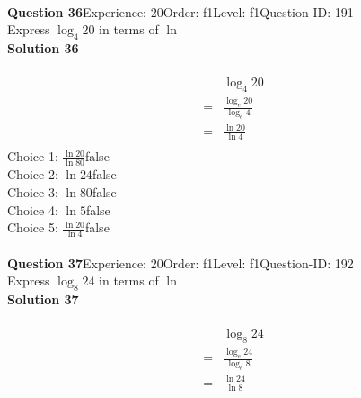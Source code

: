 \documentclass{article}
\begin{document}
\\[4pt]
\noindent\textbf{Question 36}\hspace{20pt}Experience: 20\hspace{20pt}Order: f1\hspace{20pt}Level: f1\hspace{20pt}Question-ID: 191\\[2pt]
Express $\log_{4}20$ in terms of $\ln$\\[4pt]
\noindent\textbf{Solution 36}\\[2pt]
\\[-35pt]\begin{align*}
&\log_{4}20\\[2pt]
=&\displaystyle\frac{\log_{e}20}{\log_{e}4}\\[2pt]
=&\displaystyle\frac{\ln20}{\ln4}\\[-100pt]
\end{align*}
Choice 1: \hspace{20pt}$\displaystyle\frac{\ln20}{\ln80}$\hspace{20pt}false\\
Choice 2: \hspace{20pt}$\ln{24}$\hspace{20pt}false\\
Choice 3: \hspace{20pt}$\ln{80}$\hspace{20pt}false\\
Choice 4: \hspace{20pt}$\ln{5}$\hspace{20pt}false\\
Choice 5: \hspace{20pt}$\displaystyle\frac{\ln20}{\ln4}$\hspace{20pt}false\\
\\[4pt]
\noindent\textbf{Question 37}\hspace{20pt}Experience: 20\hspace{20pt}Order: f1\hspace{20pt}Level: f1\hspace{20pt}Question-ID: 192\\[2pt]
Express $\log_{8}24$ in terms of $\ln$\\[4pt]
\noindent\textbf{Solution 37}\\[2pt]
\\[-35pt]\begin{align*}
&\log_{8}24\\[2pt]
=&\displaystyle\frac{\log_{e}24}{\log_{e}8}\\[2pt]
=&\displaystyle\frac{\ln24}{\ln8}\\[-100pt]
\end{align*}
\end{document}
